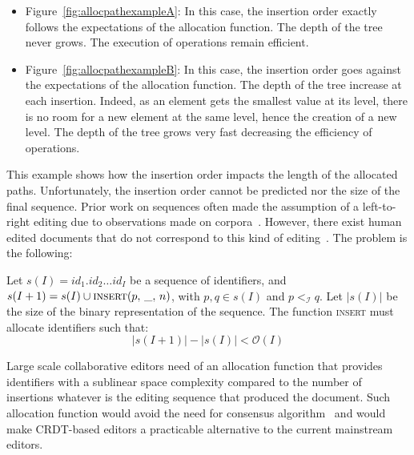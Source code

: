 \begin{itemize}[noitemsep, leftmargin=*]
\item Figure~\ref{fig:allocpathexampleA}: In this case, the insertion order
  exactly follows the expectations of the allocation function. The depth of the
  tree never grows. The execution of operations remain efficient.

\item Figure~\ref{fig:allocpathexampleB}: In this case, the insertion order goes
  against the expectations of the allocation function. The depth of the tree
  increase at each insertion. Indeed, as an element gets the smallest value at
  its level, there is no room for a new element at the same level, hence the
  creation of a new level. The depth of the tree grows very fast decreasing the
  efficiency of operations.
\end{itemize}

This example shows how the insertion order impacts the length of the allocated
paths. Unfortunately, the insertion order cannot be predicted nor the size of
the final sequence. Prior work on sequences often made the assumption of a
left-to-right editing due to observations made on
corpora~\cite{preguica2009commutative, weiss2009logoot}. However, there exist
human edited documents that do not correspond to this kind of
editing~\cite{nedelec2013lseq}. The problem is the following:
\begin{problem}
  Let $s(I)= id_1.id_2\ldots id_I$ be a sequence of identifiers, and
  $s(I+1) = s(I) \cup \textsc{insert}(p,\, \_,\, n)$, with $p,q \in s(I)$ and
  $p<_\mathcal{I}q$. Let $|s(I)|$ be the size of the binary representation of
  the sequence. The function \textsc{insert} must allocate identifiers such
  that:
  \begin{equation}
    |s(I+1)| - |s(I)| < \mathcal{O}(I)
  \end{equation}
\end{problem}

\noindent Large scale collaborative editors need of an allocation function that
provides identifiers with a sublinear space complexity compared to the number of
insertions whatever is the editing sequence that produced the document. Such
allocation function would avoid the need for consensus
algorithm~\cite{mostefaoui2015signature} and would make CRDT-based editors a
practicable alternative to the current mainstream editors.

 

